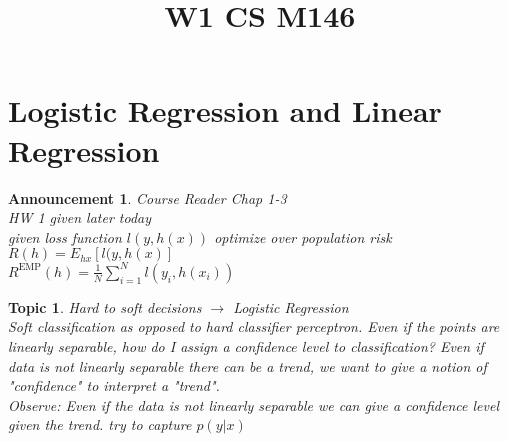 \documentclass[a4paper,12pt]{scrartcl} %
\theoremstyle{darktheorem}
\newtheorem{topic}[theorem]{Topic}
\newtheorem{announcement}[theorem]{Announcement}
\begin{document}
\title{\color{sectioncolor}W1 CS M146}
\author{}
\date{}
\maketitle

\thispagestyle{fancy}
\section{Logistic Regression and Linear Regression}
\begin{announcement}
    Course Reader Chap 1-3\\
    HW 1 given  later today\\
    given loss function $l(y,h(x))$ optimize over population risk $R(h) = E_{hx}[l(y,h(x)]$\\
    $R^{\text{EMP}}(h) = \frac{1}{N}\sum_{i=1}^{N}l(y_i,h(x_i))$
\end{announcement}
\begin{topic}
   Hard to soft decisions $\rightarrow$ Logistic Regression\\
   Soft classification as opposed to hard classifier perceptron.
   Even if the points are linearly separable, how do I assign a confidence level to classification?
   Even if data is not linearly separable there can be a trend, we want to give a notion of "confidence" to interpret a
   "trend".\\
   Observe: Even if the data  is not linearly separable we can give a confidence level given the trend.
   try to capture $p(y|x)$
\end{topic}
\end{document}
